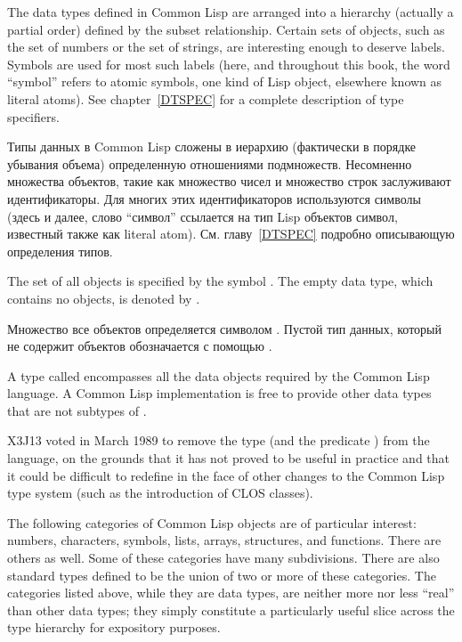 The data types defined in Common Lisp are arranged into a hierarchy (actually
a partial order) defined by the subset relationship.
Certain sets of objects, such as the set of numbers or the
set of strings, are interesting enough to deserve labels.
Symbols are used for most
such labels (here, and throughout this book, the word ``symbol''
refers to atomic symbols, one kind of Lisp object,
elsewhere known as literal atoms).  See chapter~\ref{DTSPEC}
for a complete description of type specifiers.

Типы данных в Common Lisp сложены в иерархию (фактически в порядке убывания объема) определенную отношениями подмножеств. Несомненно множества объектов, такие как множество чисел и множество строк заслуживают идентификаторы. Для многих этих идентификаторов используются символы (здесь и далее, слово ``символ'' ссылается на тип Lisp объектов символ, известный также как literal atom). См. главу~\ref{DTSPEC} подробно описывающую определения типов.

The set of all objects is specified
by the symbol {\true}.  The empty data type, which contains no objects, is
denoted by {\nil}.

Множество все объектов определяется символом {\true}. Пустой тип данных, который не содержит объектов обозначается с помощью {\nil}.

\begin{obsolete}
A type called  encompasses all the data
objects required by the Common Lisp language.  A Common Lisp implementation
is free to provide other data types that are not subtypes of .
\end{obsolete}

\begin{newer}
X3J13 voted in March 1989
to remove the type  (and the predicate )
from the language, on the grounds that it has
not proved to be useful in practice and that it could be difficult to redefine in the
face of other changes to the Common Lisp type system (such as the introduction
of CLOS classes).
\end{newer}

The following categories of Common Lisp objects are of particular interest:
numbers, characters, symbols, lists, arrays, structures, and functions.
There are others as well.
Some of these categories
have many subdivisions.  There are also standard types defined to
be the union
of two or more of these categories.  The categories listed above, while they
are data types, are neither more nor less ``real'' than other data types;
they simply constitute a particularly useful slice across
the type hierarchy for expository purposes.


